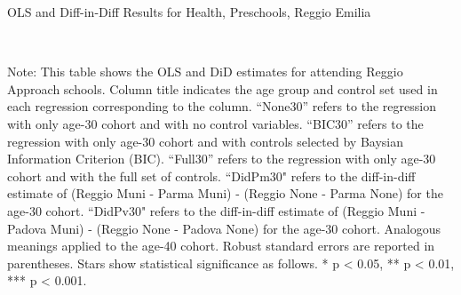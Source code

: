 \begin{landscape}

\begin{table}[H] \caption{OLS and Diff-in-Diff Results for Health, Preschools, Reggio Emilia} \label{ols-H-reg}
\scalebox{0.85}{
}
\vspace{1ex} \\
\footnotesize\raggedright{Note: This table shows the OLS and DiD estimates for attending Reggio Approach schools. Column title indicates the age group and control set used in each regression corresponding to the column. ``None30'' refers to the regression with only age-30 cohort and with no control variables. ``BIC30'' refers to the regression with only age-30 cohort and with controls selected by Baysian Information Criterion (BIC). ``Full30'' refers to the regression with only age-30 cohort and with the full set of controls. ``DidPm30" refers to the diff-in-diff estimate of (Reggio Muni - Parma Muni) - (Reggio None - Parma None) for the age-30 cohort. ``DidPv30" refers to the diff-in-diff estimate of (Reggio Muni - Padova Muni) - (Reggio None - Padova None) for the age-30 cohort. Analogous meanings applied to the age-40 cohort. Robust standard errors are reported in parentheses. Stars show statistical significance as follows. * p < 0.05, ** p < 0.01, *** p < 0.001.}
\end{table}




\end{landscape}
